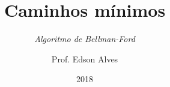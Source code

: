 \title{Caminhos mínimos}
\subtitle{\textit{Algoritmo de Bellman-Ford}}
\date{2018}
\author{Prof. Edson Alves}
